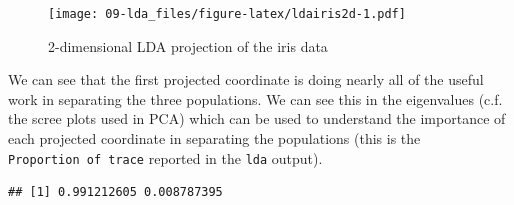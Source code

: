 \documentclass[
]{book}
\newenvironment{Shaded}{\begin{snugshade}}{\end{snugshade}}
\newcommand{\AttributeTok}[1]{\textcolor[rgb]{0.13,0.29,0.53}{#1}}
\newcommand{\DecValTok}[1]{\textcolor[rgb]{0.00,0.00,0.81}{#1}}
\newcommand{\FunctionTok}[1]{\textcolor[rgb]{0.13,0.29,0.53}{\textbf{#1}}}
\newcommand{\NormalTok}[1]{#1}
\newcommand{\OtherTok}[1]{\textcolor[rgb]{0.56,0.35,0.01}{#1}}
\newcommand{\SpecialCharTok}[1]{\textcolor[rgb]{0.81,0.36,0.00}{\textbf{#1}}}
\newcommand{\StringTok}[1]{\textcolor[rgb]{0.31,0.60,0.02}{#1}}
\theoremstyle{definition}
\theoremstyle{definition}
\theoremstyle{definition}
\theoremstyle{definition}
\theoremstyle{remark}
\begin{document}
\begin{Shaded}
\end{Shaded}

\begin{figure}
\centering
\texttt{[image: 09-lda\_files/figure-latex/ldairis2d-1.pdf]}
\caption{\label{fig:ldairis2d}2-dimensional LDA projection of the iris data}
\end{figure}

We can see that the first projected coordinate is doing nearly all of the useful work in separating the three populations. We can see this in the eigenvalues (c.f. the scree plots used in PCA) which can be used to understand the importance of each projected coordinate in separating the populations (this is the \texttt{Proportion\ of\ trace} reported in the \texttt{lda} output).

\begin{Shaded}
\end{Shaded}

\begin{verbatim}
## [1] 0.991212605 0.008787395
\end{verbatim}
\end{document}
